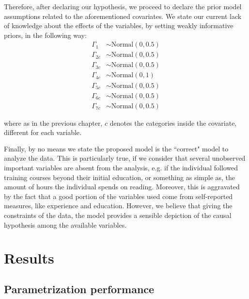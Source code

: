 Therefore, after declaring our hypothesis, we proceed to declare the prior model assumptions related to the aforementioned covariates. We state our current lack of knowledge about the effects of the variables, by setting weakly informative priors, in the following way: 
%
\begin{align}
	\Gamma_{1} &\sim \text{Normal}( 0, 0.5 ) \\
	\Gamma_{2c} &\sim \text{Normal}( 0, 0.5 ) \\
	\Gamma_{3c} &\sim \text{Normal}( 0, 0.5 ) \\
	\Gamma_{4c} &\sim \text{Normal}( 0, 1 ) \\
	\Gamma_{5c} &\sim \text{Normal}( 0, 0.5 ) \\
	\Gamma_{6c} &\sim \text{Normal}( 0, 0.5 )  \\
	\Gamma_{7c} &\sim \text{Normal}( 0, 0.5 ) 
\end{align} 

\noindent where as in the previous chapter, $c$ denotes the categories inside the covariate, different for each variable. 

Finally, by no means we state the proposed model is the ``correct" model to analyze the data. This is particularly true, if we consider that several unobserved important variables are absent from the analysis, e.g. if the individual followed training courses beyond their initial education, or something as simple as, the amount of hours the individual spends on reading. Moreover, this is aggravated by the fact that a good portion of the variables used come from self-reported measures, like experience and education. However, we believe that giving the constraints of the data, the model provides a sensible depiction of the causal hypothesis among the available variables.


\section{Results}


\subsection{Parametrization performance} \label{sub_sect:ergodicity_application}

